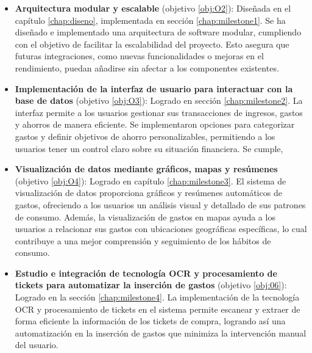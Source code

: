 \begin{itemize}

    \item \textbf{Arquitectura modular y escalable} (objetivo \ref{obj:O2}): Diseñada en el capítulo \ref{chap:diseno}, implementada en sección \ref{chap:milestone1}. Se ha diseñado e implementado una arquitectura de software modular, cumpliendo con el objetivo de facilitar la escalabilidad del proyecto. Esto asegura que futuras integraciones, como nuevas funcionalidades o mejoras en el rendimiento, puedan añadirse sin afectar a los componentes existentes.

    \item \textbf{Implementación de la interfaz de usuario para interactuar con la base de datos} (objetivo \ref{obj:O3}): Logrado en sección \ref{chap:milestone2}. La interfaz permite a los usuarios gestionar sus transacciones de ingresos, gastos y ahorros de manera eficiente. Se implementaron opciones para categorizar gastos y definir objetivos de ahorro personalizables, permitiendo a los usuarios tener un control claro sobre su situación financiera. Se cumple,

    \item \textbf{Visualización de datos mediante gráficos, mapas y resúmenes} (objetivo \ref{obj:O4}): Logrado en capítulo \ref{chap:milestone3}. El sistema de visualización de datos proporciona gráficos y resúmenes automáticos de gastos, ofreciendo a los usuarios un análisis visual y detallado de sus patrones de consumo. Además, la visualización de gastos en mapas ayuda a los usuarios a relacionar sus gastos con ubicaciones geográficas específicas, lo cual contribuye a una mejor comprensión y seguimiento de los hábitos de consumo.
    
    \item \textbf{Estudio e integración de tecnología OCR y procesamiento de tickets para automatizar la inserción de gastos} (objetivo \ref{obj:06}): Logrado en la sección \ref{chap:milestone4}. La implementación de la tecnología OCR y procesamiento de tickets en el sistema permite escanear y extraer de forma eficiente la información de los tickets de compra, logrando así una automatización en la inserción de gastos que minimiza la intervención manual del usuario.


\end{itemize}
